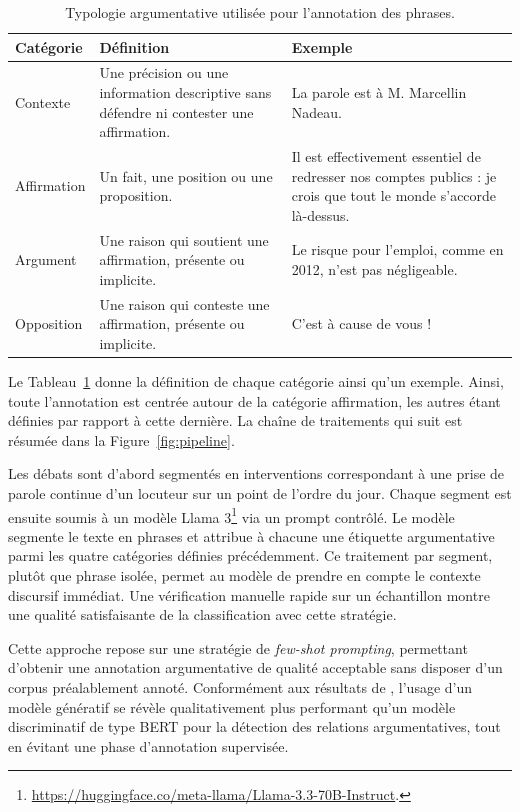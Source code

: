 \documentclass[final, fra]{anthology-ch}      %
\begin{document}
\begin{table}[h]
\centering
\renewcommand{\arraystretch}{1.2}
\begin{tabularx}{\linewidth}{l X X}
\toprule
Catégorie & Définition & Exemple \\
\midrule

Contexte & Une précision ou une information descriptive sans défendre ni contester une affirmation.
& La parole est à M. Marcellin Nadeau. \\

Affirmation & Un fait, une position ou une proposition.
& Il est effectivement essentiel de redresser nos comptes publics : je crois que tout le monde s'accorde là-dessus. \\

Argument & Une raison qui soutient une affirmation, présente ou implicite.
& Le risque pour l'emploi, comme en 2012, n'est pas négligeable. \\

Opposition & Une raison qui conteste une affirmation, présente ou implicite.
& C'est à cause de vous ! \\

\bottomrule
\end{tabularx}
\caption{Typologie argumentative utilisée pour l’annotation des phrases.}
\label{tab:exemples}
\end{table}

Le Tableau~\ref{tab:exemples} donne la définition de chaque catégorie ainsi qu'un exemple. Ainsi, toute l'annotation est centrée autour de la catégorie affirmation, les autres étant définies par rapport à cette dernière. La chaîne de traitements qui suit est résumée dans la Figure~\ref{fig:pipeline}.


Les débats sont d’abord segmentés en interventions correspondant à une prise de parole continue d’un locuteur sur un point de l’ordre du jour. Chaque segment est ensuite soumis à un modèle Llama 3\footnote{\url{https://huggingface.co/meta-llama/Llama-3.3-70B-Instruct}.} via un prompt contrôlé. Le modèle segmente le texte en phrases et attribue à chacune une étiquette argumentative parmi les quatre catégories définies précédemment. Ce traitement par segment, plutôt que phrase isolée, permet au modèle de prendre en compte le contexte discursif immédiat. Une vérification manuelle rapide sur un échantillon montre une qualité satisfaisante de la classification avec cette stratégie.

Cette approche repose sur une stratégie de \textit{few-shot prompting}, permettant d’obtenir une annotation argumentative de qualité acceptable sans disposer d’un corpus préalablement annoté.
Conformément aux résultats de \cite{gorur2025}, l’usage d’un modèle génératif se révèle qualitativement plus performant qu’un modèle discriminatif de type BERT \cite{devlinCLT19} pour la détection des relations argumentatives, tout en évitant une phase d’annotation supervisée.
\end{document}
